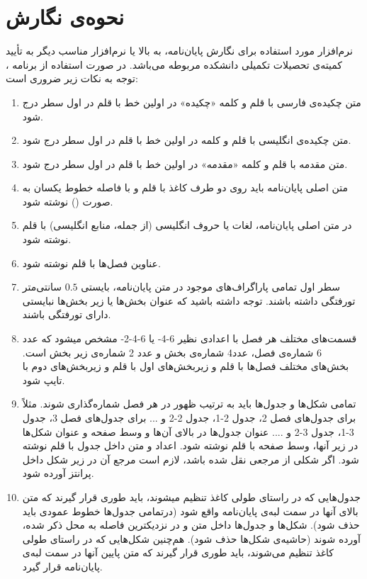 		\section{نحوه‌ی نگارش}
			نرم‌افزار مورد استفاده برای نگارش پایان‌نامه،   به بالا یا نرم‌افزار مناسب دیگر به تأیید كمیته‌ی تحصیلات تكمیلی دانشکده مربوطه می‌باشد. در صورت استفاده از برنامه ، توجه به نكات زیر ضروری است:  
			\begin{enumerate}%
				\item متن چکیده‌ی فارسی با قلم  و کلمه «چکیده» در اولین خط با قلم  در اول سطر درج شود. 
				\item متن چکیده‌ی انگلیسی با قلم  و کلمه  در اولین خط با قلم  در اول سطر درج شود. 
				\item متن مقدمه با قلم  و کلمه «مقدمه» در اولین خط با قلم  در اول سطر درج شود.
				\item متن اصلی پایان‌نامه باید روی دو طرف کاغذ  با قلم  و با فاصله خطوط یکسان به صورت () نوشته شود. 
				\item در متن اصلی پایان‌نامه، لغات یا حروف انگلیسی (از جمله، منابع انگلیسی) با قلم  نوشته شود.
				\item عناوین فصل‌ها با قلم  نوشته شود.
				\item سطر اول تمامی پاراگراف‌های موجود در متن پایان‌نامه، بایستی $0.5$ سانتی‌متر تورفتگی داشته باشند. توجه داشته باشید که عنوان بخش‌ها یا زیر بخش‌ها نبایستی دارای تورفتگی باشند.
				\item قسمت‌های مختلف هر فصل با اعدادی نظیر 6-4- یا 6-4-2- مشخص میشود كه عدد 6 شماره‌ی فصل، عدد4 شماره‌ی بخش و عدد 2 شماره‌ی زیر بخش است. بخش‌های مختلف فصل‌ها با قلم  و زیربخش‌های اول با قلم   و زیربخش‌های دوم با  تایپ شود.
				\item تمامی شکل‌ها و جدول‌ها باید به ترتیب ظهور در هر فصل شماره‌گذاری شوند. مثلاً برای جدول‌های فصل 2، جدول 2-1، جدول 2-2 و ... برای جدول‌های فصل 3، جدول 3-1، جدول 3-2 و .... عنوان جدول‌ها در بالای آن‌ها و وسط صفحه و عنوان شکل‌ها در زیر آنها، وسط صفحه با قلم   نوشته شود. اعداد و متن داخل جدول با قلم    نوشته شود. اگر شکلی از مرجعی نقل شده باشد، لازم است مرجع آن در زیر شکل داخل پرانتز آورده شود.
				\item جدول‌هایی که در راستای طولی کاغذ تنظیم میشوند، باید طوری قرار گیرند که متن بالای آنها در سمت لبه‌ی پایان‌نامه واقع شود (درتمامی جدول‌ها خطوط عمودی باید حذف شود). شکل‌ها و جدول‌ها داخل متن و در نزدیکترین فاصله به محل ذکر شده، آورده شوند (حاشیه‌ی شکل‌ها حذف شود). هم‌چنین شکل‌هایی که در راستای طولی کاغذ تنظیم می‌شوند، باید طوری قرار گیرند که متن پایین آنها در سمت لبه‌ی پایان‌نامه قرار گیرد. 

\end{enumerate}
